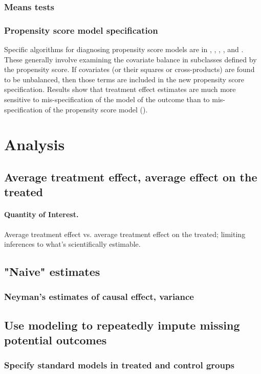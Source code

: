 \documentclass[11pt,titlepage]{article}
\begin{document}
\subsubsection{Means tests}
\subsubsection{Propensity score model specification}
  Specific algorithms for diagnosing propensity score models are in \cite{RosRub84}, \cite{Perkins00}, \cite{DehWah02},
\cite{MicBloHil04}, and \cite{matchitdocs}.  These generally involve examining the covariate balance in subclasses defined by the propensity score.  If
covariates (or their squares or cross-products) are found to be unbalanced, then those terms are included in the new propensity score specification.  
Results show that treatment effect estimates are much more sensitive to mis-specification of the model of the outcome than 
to mis-specification of the propensity score model (\cite{Drake93, DehWah99, DehWah02, Zhao04}).


\section{Analysis}
\label{analysis}
\subsection{Average treatment effect, average effect on the treated}
\paragraph{Quantity of Interest.} Average treatment effect vs. average
  treatment effect on the treated; limiting inferences to what's
  scientifically estimable. 

\subsection{"Naive" estimates}
\subsubsection{Neyman's estimates of causal effect, variance}
\subsection{Use modeling to repeatedly impute missing potential outcomes}
\subsubsection{Specify standard models in treated and control groups}
\end{document}
